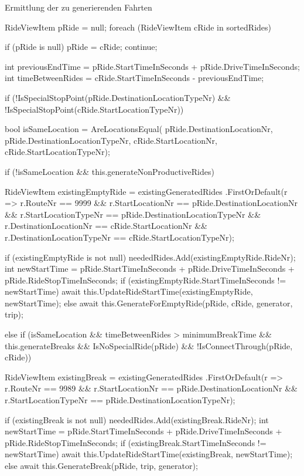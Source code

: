     \begin{program} [H]
        \caption{Ermittlung der zu generierenden Fahrten}
        \label{prog:RideGeneration}
    \begin{CsCode}[numbers=left]
RideViewItem pRide = null;
foreach (RideViewItem cRide in sortedRides)
{
    if (pRide is null){ pRide = cRide; continue; }

    int previousEndTime = pRide.StartTimeInSeconds + pRide.DriveTimeInSeconds;
    int timeBetweenRides = cRide.StartTimeInSeconds - previousEndTime;

    if (!IsSpecialStopPoint(pRide.DestinationLocationTypeNr) &&
        !IsSpecialStopPoint(cRide.StartLocationTypeNr))
    {
        bool isSameLocation = AreLocationsEqual(
            pRide.DestinationLocationNr, pRide.DestinationLocationTypeNr,
            cRide.StartLocationNr, cRide.StartLocationTypeNr);

        if (!isSameLocation && this.generateNonProductiveRides)
        {
            RideViewItem existingEmptyRide = existingGeneratedRides
                .FirstOrDefault(r => r.RouteNr == 9999 &&
                    r.StartLocationNr == pRide.DestinationLocationNr &&
                    r.StartLocationTypeNr == pRide.DestinationLocationTypeNr &&
                    r.DestinationLocationNr == cRide.StartLocationNr &&
                    r.DestinationLocationTypeNr == cRide.StartLocationTypeNr);

            if (existingEmptyRide is not null)
            {
                neededRides.Add(existingEmptyRide.RideNr);
                int newStartTime = pRide.StartTimeInSeconds + 
                    pRide.DriveTimeInSeconds + pRide.RideStopTimeInSeconds;
                if (existingEmptyRide.StartTimeInSeconds != newStartTime)
                    await this.UpdateRideStartTime(existingEmptyRide, newStartTime);
            }
            else
                await this.GenerateForEmptyRide(pRide, cRide, generator, trip);
        }
        else if (isSameLocation && timeBetweenRides > minimumBreakTime && 
                    this.generateBreaks &&
                    IsNoSpecialRide(pRide) && !IsConnectThrough(pRide, cRide))
        {
            RideViewItem existingBreak = existingGeneratedRides
                .FirstOrDefault(r => r.RouteNr == 9989 &&
                    r.StartLocationNr == pRide.DestinationLocationNr &&
                    r.StartLocationTypeNr == pRide.DestinationLocationTypeNr);

            if (existingBreak is not null)
            {
                neededRides.Add(existingBreak.RideNr);
                int newStartTime = pRide.StartTimeInSeconds + 
                    pRide.DriveTimeInSeconds + pRide.RideStopTimeInSeconds;
                if (existingBreak.StartTimeInSeconds != newStartTime)
                    await this.UpdateRideStartTime(existingBreak, newStartTime);
            }
            else
                await this.GenerateBreak(pRide, trip, generator);
        }
    }
}\end{CsCode} \end{program}

